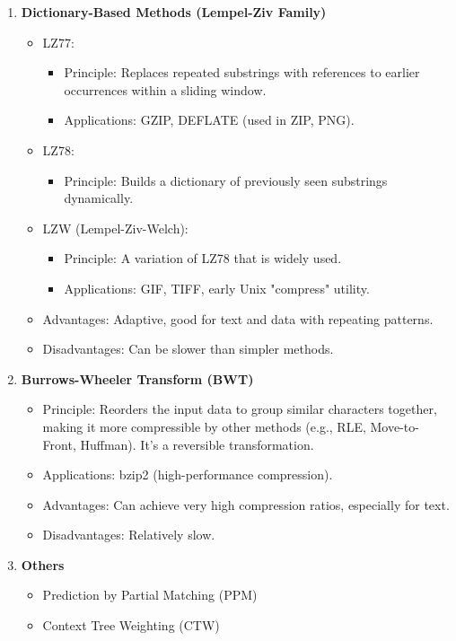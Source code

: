 \begin{enumerate}[label=\textbf{\Alph*.}]
\begin{itemize}
    \end{itemize}
    \item \textbf{Dictionary-Based Methods (Lempel-Ziv Family)} \begin{itemize}
        \item  LZ77: \begin{itemize}
            \item Principle: Replaces repeated substrings with references to earlier occurrences within a sliding window.
            \item Applications: GZIP, DEFLATE (used in ZIP, PNG).
        \end{itemize} 
        \item LZ78: \begin{itemize}
            \item Principle: Builds a dictionary of previously seen substrings dynamically.
        \end{itemize}
        \item LZW (Lempel-Ziv-Welch): \begin{itemize}
            \item Principle: A variation of LZ78 that is widely used.
            \item Applications: GIF, TIFF, early Unix "compress" utility.
        \end{itemize}
        \item Advantages: Adaptive, good for text and data with repeating patterns.
        \item Disadvantages: Can be slower than simpler methods.
    \end{itemize}
    \newpage
    \item \textbf{Burrows-Wheeler Transform (BWT)} \begin{itemize}
        \item Principle: Reorders the input data to group similar characters together, making it more compressible by other methods (e.g., RLE, Move-to-Front, Huffman). It's a reversible transformation.
        \item Applications: bzip2 (high-performance compression).
        \item Advantages: Can achieve very high compression ratios, especially for text.
        \item Disadvantages: Relatively slow.
    \end{itemize}
    \item \textbf{Others} \begin{itemize}
        \item Prediction by Partial Matching (PPM)
        \item Context Tree Weighting (CTW)
    \end{itemize}
\end{enumerate}
